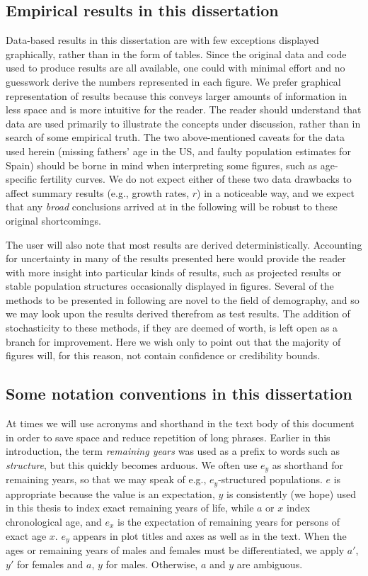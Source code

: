 \subsection{Empirical results in this dissertation}

Data-based results in this dissertation are with few exceptions displayed
graphically, rather than in the form of tables. Since the original data and
code used to produce results are all available, one could with minimal effort
and no guesswork derive the numbers represented in each figure. We prefer
graphical representation of results because this conveys larger amounts of
information in less space and is more intuitive for the reader. The reader
should understand that data are used primarily to illustrate the concepts under discussion, rather
than in search of some empirical truth. The two
above-mentioned caveats for the data used herein (missing fathers' age in the
US, and faulty population estimates for Spain) should be borne in mind when
interpreting some figures, such as age-specific fertility curves. We do not
expect either of these two data drawbacks to affect summary results 
(e.g., growth rates, $r$) in a noticeable way, and we expect that any
\textit{broad} conclusions arrived at in the following will be robust to these
original shortcomings. 

The user will also note that most results are derived deterministically.
Accounting for uncertainty in many of the results presented here would provide
the reader with more insight into particular kinds of results, such as projected
results or stable population structures occasionally displayed in figures.
Several of the methods to be presented in following are novel to the field of
demography, and so we may look upon the results derived therefrom as test
results. The addition of stochasticity to these methods, if they are deemed of
worth, is left open as a branch for improvement. Here we wish only to point out
that the majority of figures will, for this reason, not contain confidence or
credibility bounds.

\subsection{Some notation conventions in this dissertation}
At times we will use acronyms and shorthand in the text body of this document in
order to save space and reduce repetition of long phrases. Earlier in this
introduction, the term \textit{remaining years} was used as a prefix to words
such as \textit{structure}, but this quickly becomes arduous. We often use $e_y$
as shorthand for remaining years, so that we may speak of e.g., $e_y$-structured
populations. $e$ is appropriate because the value is an expectation, $y$ is
consistently (we hope) used in this thesis to index exact remaining years of
life, while $a$ or $x$ index chronological age, and $e_x$ is the expectation of 
remaining years for persons of exact age $x$. $e_y$ appears in plot titles and
axes as well as in the text. When the ages or remaining years of males and
females must be differentiated, we apply $a'$, $y'$ for females and $a$, $y$ for
males. Otherwise, $a$ and $y$ are ambiguous.

